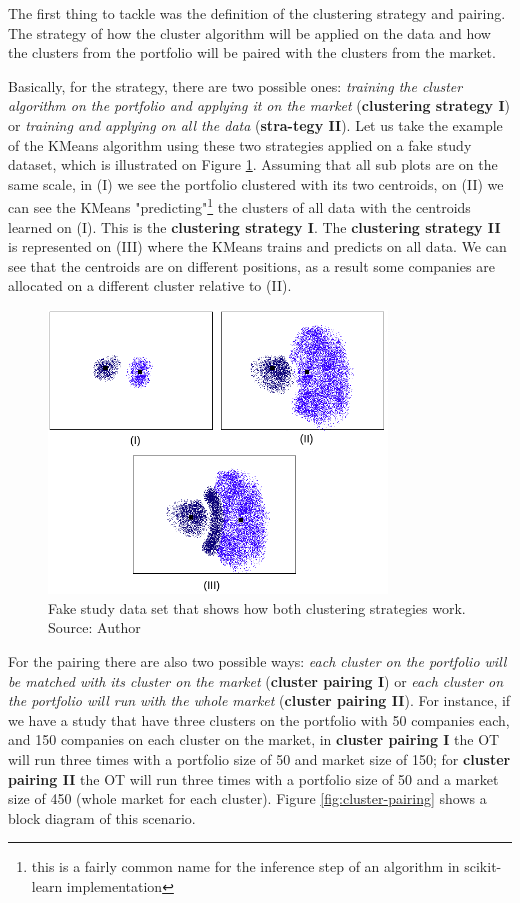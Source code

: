 The first thing to tackle was the definition of the clustering strategy and pairing. The strategy of how the cluster algorithm will be applied on the data and how the clusters from the portfolio will be paired with the clusters from the market. 

Basically, for the strategy, there are two possible ones: \textit{training the cluster algorithm on the portfolio and applying it on the market} (\textbf{clustering strategy I}) or \textit{training and applying on all the data} (\textbf{stra-tegy II}). Let us take the example of the KMeans algorithm using these two strategies applied on a fake study dataset, which is illustrated on Figure \ref{fig:cluster-strategy}. Assuming that all sub plots are on the same scale, in (I) we see the portfolio clustered with its two centroids, on (II) we can see the KMeans "predicting"\footnote{this is a fairly common name for the inference step of an algorithm in scikit-learn implementation} the clusters of all data with the centroids learned on (I). This is the \textbf{clustering strategy I}. The \textbf{clustering strategy II} is represented on (III) where the KMeans trains and predicts on all data. We can see that the centroids are on different positions, as a result some companies are allocated on a different cluster relative to (II). 

\begin{figure}[h]
   \centering
   \includegraphics[width=9cm]{fig/ch3-cluster-strategy.png}
   \caption{Fake study data set that shows how both clustering strategies work. Source: Author}
   \label{fig:cluster-strategy}
\end{figure}

For the pairing there are also two possible ways: \textit{each cluster on the portfolio will be matched with its cluster on the market} (\textbf{cluster pairing I}) or \textit{each cluster on the portfolio will run with the whole market} (\textbf{cluster pairing II}). For instance, if we have a study that have three clusters on the portfolio with 50 companies each, and 150 companies on each cluster on the market, in \textbf{cluster pairing I} the OT will run three times with a portfolio size of 50 and market size of 150; for \textbf{cluster pairing II} the OT will run three times with a portfolio size of 50 and a market size of 450 (whole market for each cluster). Figure \ref{fig:cluster-pairing} shows a block diagram of this scenario.

